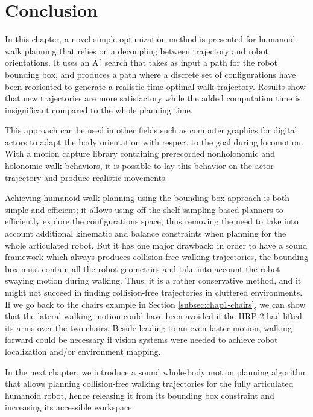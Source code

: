\section{Conclusion}
In this chapter, a novel simple optimization method is
presented for humanoid walk planning that relies on a decoupling
between trajectory and robot orientations. It uses an A$^{*}$ search that
takes as input a path for the robot bounding box, and produces a path
where a discrete set of configurations have been reoriented to generate
a realistic time-optimal walk trajectory. Results show that new
trajectories are more satisfactory while the added computation time is
insignificant compared to the whole planning time.

This approach can be used in other fields such as computer graphics
for digital actors to adapt the body orientation with respect to the
goal during locomotion. With a motion capture library containing
prerecorded nonholonomic and holonomic walk behaviors, it is possible
to lay this behavior on the actor trajectory and produce realistic
movements.

Achieving humanoid walk planning using the bounding box approach is
both simple and efficient; it allows using off-the-shelf
sampling-based planners to efficiently explore the configurations
space, thus removing the need to take into account additional
kinematic and balance constraints when planning for the whole
articulated robot. But it has one major drawback: in order to have a
sound framework which always produces collision-free walking
trajectories, the bounding box must contain all the robot geometries
and take into account the robot swaying motion during walking. Thus,
it is a rather conservative method, and it might not succeed in
finding collision-free trajectories in cluttered environments. If we
go back to the chairs example in Section \ref{subsec:chap1-chairs}, we
can show that the lateral walking motion could have been avoided if
the HRP-2 had lifted its arms over the two chairs. Beside leading to
an even faster motion, walking forward could be necessary if vision
systems were needed to achieve robot localization and/or environment
mapping.

In the next chapter, we introduce a sound whole-body motion planning
algorithm that allows planning collision-free walking trajectories for
the fully articulated humanoid robot, hence releasing it from its
bounding box constraint and increasing its accessible workspace.
